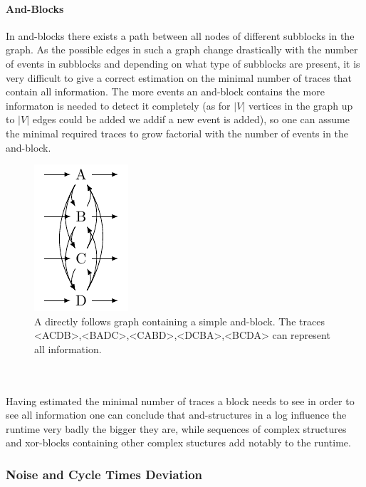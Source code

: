 \documentclass[
	a4paper,
	pagesize,
	pdftex,
	12pt,
	twoside, %
	BCOR=5mm, %
	ngerman,
	fleqn,
	final,
	]{scrartcl}
\begin{document}
\paragraph{And-Blocks}
In and-blocks there exists a path between all nodes of different subblocks in the graph.
As the possible edges in such a graph change drastically with the number of events in subblocks and depending on what type of subblocks are present, it is very difficult to give a correct estimation on the minimal number of traces that contain all information. The more events an and-block contains the more informaton is needed to detect it completely (as for $|V|$ vertices in the graph up to $|V|$ edges could be added we addif  a new event is added), so one can assume the minimal required traces to grow factorial with the number of events in the and-block.
\begin{figure}[h]
  \vspace{-20pt}
	\begin{center}
		\includegraphics[width=.2\linewidth]{img/and.pdf}
	\end{center}
	  \vspace{-10pt}
	\caption{A directly follows graph containing a simple and-block. The traces <ACDB>,<BADC>,<CABD>,<DCBA>,<BCDA> can represent all information.}
	\label{fig:andExample}
\end{figure}\\\\
Having estimated the minimal number of traces a block needs to see in order to see all information one can conclude that and-structures in a log influence the runtime very badly the bigger they are, while sequences of complex structures and xor-blocks containing other complex stuctures add notably to the runtime.\\
\subsubsection{Noise and Cycle Times Deviation}
\end{document}
